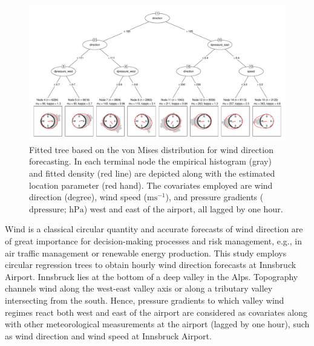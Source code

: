 \documentclass[twoside]{report}
\begin{document}
\begin{figure}[p!]\centering
\includegraphics[height = .5\textheight,angle=90,origin=c]{schlosser-circtree_plot.pdf}
\caption{Fitted tree based on the von Mises distribution for wind direction forecasting.
In each terminal node the empirical histogram (gray) and fitted density (red line)
are depicted along with the estimated location parameter (red hand). The covariates
employed are wind direction (degree), wind speed ($\text{ms}^{-1}$),
and pressure gradients ($\text{dpressure; hPa}$) west and east of the airport,
all lagged by one hour.}
\label{schlosser:fig_tree} \end{figure}

Wind is a classical circular quantity and accurate forecasts of wind direction
are of great importance for decision-making processes and risk management,
e.g., in air traffic management or renewable energy production. This study
employs circular regression trees to obtain hourly wind direction
forecasts at Innsbruck Airport.
Innsbruck lies at the bottom of a deep valley in the Alps. Topography
channels wind along the west-east valley axis or along a tributary valley
intersecting from the south. Hence, pressure gradients to which valley wind
regimes react both west and east of the airport are considered as covariates
along with other meteorological measurements at the airport (lagged by one hour),
such as wind direction and wind speed at Innsbruck Airport.
\end{document}

